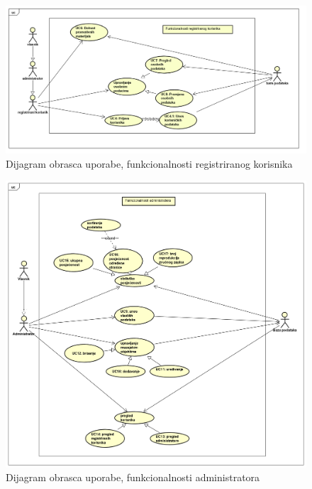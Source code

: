 \begin{figure}[H]
	\includegraphics[scale=0.4]{slike/registrirani_korisnik.png}
	\centering
	\caption{Dijagram obrasca uporabe, funkcionalnosti registriranog korisnika}
	\label{fig:promjene}
\end{figure}	
\begin{figure}[H]
	\includegraphics[scale=0.35]{slike/Administrator.png}
	\centering
	\caption{Dijagram obrasca uporabe, funkcionalnosti administratora}
	\label{fig:promjene}
\end{figure}
